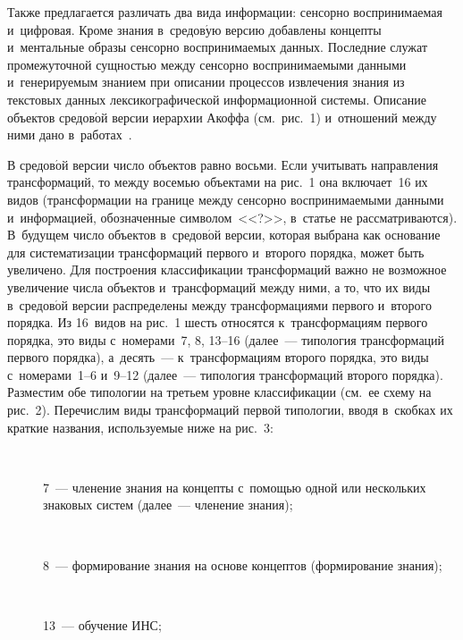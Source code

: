 \begin{multicols}{2}
  Также предлагается различать два вида информации: сенсорно 
воспринимаемая и~цифровая. Кроме знания в~средов$\acute{\mbox{у}}$ю 
версию добавлены концепты и~ментальные образы сенсорно воспринимаемых 
данных. Последние служат промежуточной сущностью между сенсорно 
воспринимаемыми данными и~генерируемым знанием при описании процессов 
извлечения знания из текстовых данных лексикографической информационной 
системы. Описание объектов средов$\acute{\mbox{о}}$й версии иерархии 
Акоффа (см.\ рис.~1) и~отношений между ними дано в~работах~\cite{26-zac, 28-zac}.
  
  В средов$\acute{\mbox{о}}$й версии число объектов равно восьми. Если 
учитывать направления трансформаций, то между восемью объектами на 
рис.~1 она включает~16 их видов (трансформации на границе между сенсорно 
воспринимаемыми данными и~информацией, обозначенные символом~<<?>>, 
в~статье не рас\-смат\-ри\-ва\-ют\-ся). В~будущем число объектов 
в~средов$\acute{\mbox{о}}$й версии, которая выбрана как основание для 
сис\-те\-ма\-ти\-за\-ции трансформаций первого и~второго порядка, может быть 
увеличено. Для построения классификации трансформаций 
важ\-но не возможное увеличение числа объектов 
и~трансформаций между ними, а то, что их виды в~средов$\acute{\mbox{о}}$й 
версии распределены между трансформациями первого и~второго порядка. Из 
16~видов на рис.~1 шесть относятся к~трансформациям первого порядка, это\linebreak 
виды с~номерами~7, 8, 13--16 (далее~--- типология трансформаций первого 
порядка), а~десять~--- к~трансформациям второго порядка, это виды 
с~\mbox{номерами}~1--6 и~9--12 (далее~--- типология трансформаций второго 
порядка). Разместим обе типологии на третьем уровне классификации (см.\ ее 
схему на рис.~2). Перечислим виды трансформаций первой типологии, вводя 
в~скобках их краткие названия, используемые ниже на рис.~3:
  \begin{description}
  \item[\,] 7~--- членение знания на концепты с~помощью одной или нескольких 
знаковых систем (далее~--- членение знания);
  \item[\,] 8~--- формирование знания на основе концептов (формирование 
знания);
  \item[\,] 13~--- обучение ИНС;
  \end{description}
  
  \vspace*{-6pt}
  
  \pagebreak
  
  \end{multicols}
  
